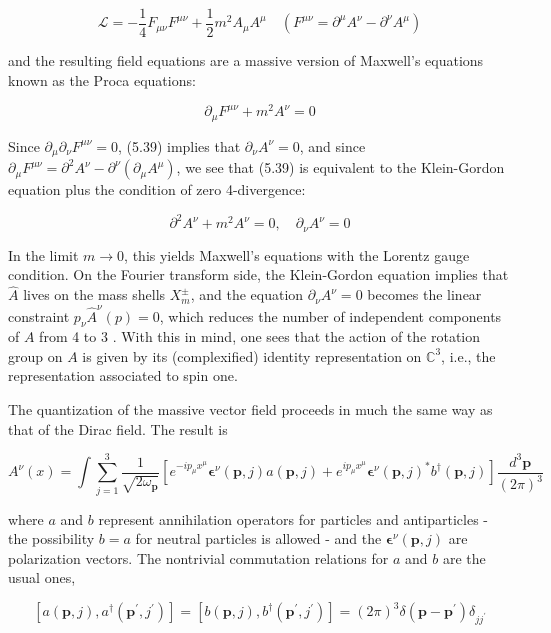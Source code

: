 \documentclass[10pt, letterpaper]{article}
\begin{document}
$$
\mathcal{L}=-\frac{1}{4} F_{\mu \nu} F^{\mu \nu}+\frac{1}{2} m^{2} A_{\mu} A^{\mu} \quad\left(F^{\mu \nu}=\partial^{\mu} A^{\nu}-\partial^{\nu} A^{\mu}\right)
$$

and the resulting field equations are a massive version of Maxwell's equations known as the Proca equations:

$$
\partial_{\mu} F^{\mu \nu}+m^{2} A^{\nu}=0
$$

Since $\partial_{\mu} \partial_{\nu} F^{\mu \nu}=0$, (5.39) implies that $\partial_{\nu} A^{\nu}=0$, and since $\partial_{\mu} F^{\mu \nu}=\partial^{2} A^{\nu}- \partial^{\nu}\left(\partial_{\mu} A^{\mu}\right)$, we see that (5.39) is equivalent to the Klein-Gordon equation plus the condition of zero 4-divergence:

$$
\partial^{2} A^{\nu}+m^{2} A^{\nu}=0, \quad \partial_{\nu} A^{\nu}=0
$$

In the limit $m \rightarrow 0$, this yields Maxwell's equations with the Lorentz gauge condition. On the Fourier transform side, the Klein-Gordon equation implies that $\widehat{A}$ lives on the mass shells $X_{m}^{ \pm}$, and the equation $\partial_{\nu} A^{\nu}=0$ becomes the linear constraint $p_{\nu} \widehat{A}^{\nu}(p)=0$, which reduces the number of independent components of $A$ from 4 to 3 . With this in mind, one sees that the action of the rotation group on $A$ is given by its (complexified) identity representation on $\mathbb{C}^{3}$, i.e., the representation associated to spin one.

The quantization of the massive vector field proceeds in much the same way as that of the Dirac field. The result is

$$
A^{\nu}(x)=\int \sum_{j=1}^{3} \frac{1}{\sqrt{2 \omega_{\mathbf{p}}}}\left[e^{-i p_{\mu} x^{\mu}} \boldsymbol{\epsilon}^{\nu}(\mathbf{p}, j) a(\mathbf{p}, j)+e^{i p_{\mu} x^{\mu}} \boldsymbol{\epsilon}^{\nu}(\mathbf{p}, j)^{*} b^{\dagger}(\mathbf{p}, j)\right] \frac{d^{3} \mathbf{p}}{(2 \pi)^{3}}
$$

where $a$ and $b$ represent annihilation operators for particles and antiparticles - the possibility $b=a$ for neutral particles is allowed - and the $\boldsymbol{\epsilon}^{\nu}(\mathbf{p}, j)$ are polarization vectors. The nontrivial commutation relations for $a$ and $b$ are the usual ones,

$$
\left[a(\mathbf{p}, j), a^{\dagger}\left(\mathbf{p}^{\prime}, j^{\prime}\right)\right]=\left[b(\mathbf{p}, j), b^{\dagger}\left(\mathbf{p}^{\prime}, j^{\prime}\right)\right]=(2 \pi)^{3} \delta\left(\mathbf{p}-\mathbf{p}^{\prime}\right) \delta_{j j^{\prime}}
$$
\end{document}
